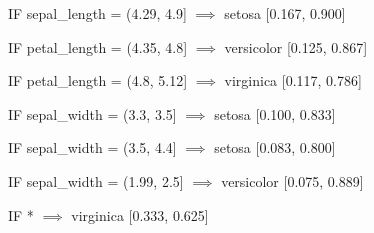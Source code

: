 IF sepal_length = (4.29, 4.9] $\implies$ setosa [0.167, 0.900]

IF petal_length = (4.35, 4.8] $\implies$ versicolor [0.125, 0.867]

IF petal_length = (4.8, 5.12] $\implies$ virginica [0.117, 0.786]

IF sepal_width = (3.3, 3.5] $\implies$ setosa [0.100, 0.833]

IF sepal_width = (3.5, 4.4] $\implies$ setosa [0.083, 0.800]

IF sepal_width = (1.99, 2.5] $\implies$ versicolor [0.075, 0.889]

IF * $\implies$ virginica [0.333, 0.625]
